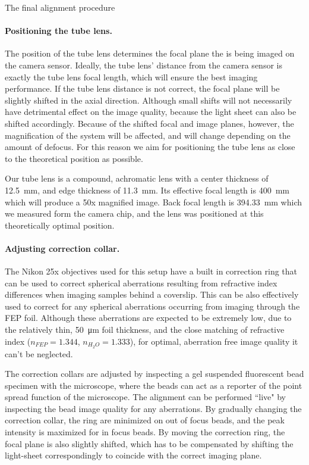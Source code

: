     The final alignment procedure 

    \paragraph{Positioning the tube lens.}
      The position of the tube lens determines the focal plane the is being imaged on the camera sensor. Ideally, the tube lens' distance from the camera sensor is exactly the tube lens focal length, which will ensure the best imaging performance. If the tube lens distance is not correct, the focal plane will be slightly shifted in the axial direction. Although small shifts will not necessarily have detrimental effect on the image quality, because the light sheet can also be shifted accordingly. Because of the shifted focal and image planes, however, the magnification of the system will be affected, and will change depending on the amount of defocus. For this reason we aim for positioning the tube lens as close to the theoretical position as possible.

      Our tube lens is a compound, achromatic lens with a center thickness of \SI{12.5}{mm}, and edge thickness of \SI{11.3}{mm}. Its effective focal length is \SI{400}{mm} which will produce a 50x magnified image. Back focal length is \SI{394.33}{mm} which we measured form the camera chip, and the lens was positioned at this theoretically optimal position.

    \paragraph{Adjusting correction collar.}
      The Nikon 25x objectives used for this setup have a built in correction ring that can be used to correct spherical aberrations resulting from refractive index differences when imaging samples behind a coverslip. This can be also effectively used to correct for any spherical aberrations occurring from imaging through the FEP foil. Although these aberrations are expected to be extremely low, due to the relatively thin, \SI{50}{\micro m} foil thickness, and the close matching of refractive index ($n_{FEP} = 1.344$, $n_{H_2O}=1.333$), for optimal, aberration free image quality it can't be neglected.

      The correction collars are adjusted by inspecting a gel suspended fluorescent bead specimen with the microscope, where the beads can act as a reporter of the point spread function of the microscope. The alignment can be performed ``live" by inspecting the bead image quality for any aberrations. By gradually changing the correction collar, the ring are minimized on out of focus beads, and the peak intensity is maximized for in focus beads. By moving the correction ring, the focal plane is also slightly shifted, which has to be compensated by shifting the light-sheet correspondingly to coincide with the correct imaging plane.

